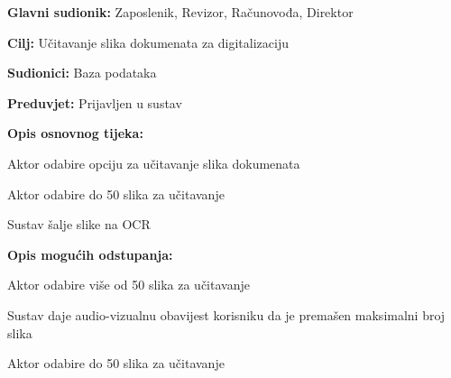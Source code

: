 					
					\noindent {}
					\begin{packed_item}
						
						\item \textbf{Glavni sudionik: } Zaposlenik, Revizor, Računovođa, Direktor
						\item \textbf{Cilj:} Učitavanje slika dokumenata za digitalizaciju
						\item \textbf{Sudionici:} Baza podataka
						\item \textbf{Preduvjet:} Prijavljen u sustav
						\item \textbf{Opis osnovnog tijeka:}
						
						\item[] \begin{packed_enum}
							
							\item Aktor odabire opciju za učitavanje slika dokumenata
							\item Aktor odabire do 50 slika za učitavanje
							\item Sustav šalje slike na OCR
							
						\end{packed_enum}
						
						\item \textbf{Opis mogućih odstupanja:}
						
						\item[] \begin{packed_item}
							
							\item[2.a] Aktor odabire više od 50 slika za učitavanje
							\item[] \begin{packed_enum}
								
								\item Sustav daje audio-vizualnu obavijest korisniku da je premašen maksimalni broj slika
								\item Aktor odabire do 50 slika za učitavanje
								
							\end{packed_enum}
							
						\end{packed_item}
					\end{packed_item}
					
